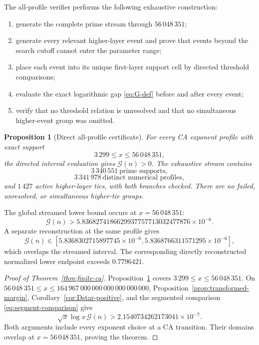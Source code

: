 \documentclass[11pt,a4paper]{article}
\numberwithin{equation}{section}
\newtheorem{proposition}[theorem]{Proposition}
\theoremstyle{definition}
\newcommand{\Xmin}{3\,299}
\newcommand{\Xdirect}{56\,048\,351}
\newcommand{\Xmax}{164\,967\,000\,000\,000\,000\,000\,000}
\newcommand{\Ggap}{\mathcal G}
\begin{document}
The all-profile verifier performs the following exhaustive construction:
\begin{enumerate}
  \item generate the complete prime stream through \(\Xdirect\);
  \item generate every relevant higher-layer event and prove that events
        beyond the search cutoff cannot enter the parameter range;
  \item place each event into its unique first-layer support cell by directed
        threshold comparisons;
  \item evaluate the exact logarithmic gap \eqref{eq:G-def} before and after
        every event;
  \item verify that no threshold relation is unresolved and that no
        simultaneous higher-event group was omitted.
\end{enumerate}

\begin{proposition}[Direct all-profile certificate]\label{prop:direct-ca}
For every CA exponent profile with exact support
\[
  \Xmin\le x\le\Xdirect,
\]
the directed interval evaluation gives \(\Ggap(n)>0\).
The exhaustive stream contains
\[
  3\,340\,551\ \text{prime supports},
\]
\[
  3\,341\,978\ \text{distinct numerical profiles},
\]
and \(1\,427\) active higher-layer ties, with both branches checked.
There are no failed, unresolved, or simultaneous higher-tie groups.
\end{proposition}

The global streamed lower bound occurs at \(x=\Xdirect\):
\[
  \Ggap(n)>
  5.8368274186629937757713032477876\times10^{-6}.
\]
A separate reconstruction at the same profile gives
\[
  \Ggap(n)\in
  [
  5.8368302715897745\times10^{-6},
  5.8368766311571295\times10^{-6}
  ],
\]
which overlaps the streamed interval.  The corresponding directly
reconstructed normalized lower endpoint exceeds \(0.7796421\).

\begin{proof}[Proof of Theorem~\ref{thm:finite-ca}]
Proposition~\ref{prop:direct-ca} covers
\(\Xmin\le x\le\Xdirect\).  On
\(\Xdirect\le x\le\Xmax\), Proposition~\ref{prop:transformed-margin},
Corollary~\ref{cor:Dstar-positive}, and the segmented comparison
\eqref{eq:segment-comparison} give
\[
  \sqrt{x}\log x\,\Ggap(n)
  >
  2.1540734262173041\times10^{-7}.
\]
Both arguments include every exponent choice at a CA transition.  Their
domains overlap at \(x=\Xdirect\), proving the theorem.
\end{proof}
\end{document}
